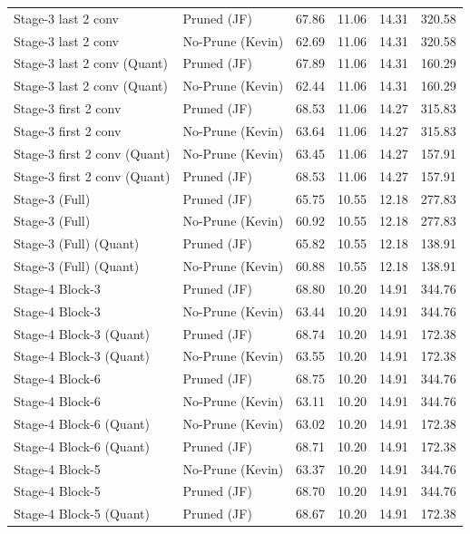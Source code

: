 \begin{table}
\begin{tabular}{llrrrr}
Stage-3 last 2 conv & Pruned (JF) & 67.86 & 11.06 & 14.31 & 320.58 \\
Stage-3 last 2 conv & No-Prune (Kevin) & 62.69 & 11.06 & 14.31 & 320.58 \\
Stage-3 last 2 conv
(Quant) & Pruned (JF) & 67.89 & 11.06 & 14.31 & 160.29 \\
Stage-3 last 2 conv
(Quant) & No-Prune (Kevin) & 62.44 & 11.06 & 14.31 & 160.29 \\
Stage-3 first 2 conv & Pruned (JF) & 68.53 & 11.06 & 14.27 & 315.83 \\
Stage-3 first 2 conv & No-Prune (Kevin) & 63.64 & 11.06 & 14.27 & 315.83 \\
Stage-3 first 2 conv
(Quant) & No-Prune (Kevin) & 63.45 & 11.06 & 14.27 & 157.91 \\
Stage-3 first 2 conv
(Quant) & Pruned (JF) & 68.53 & 11.06 & 14.27 & 157.91 \\
Stage-3 (Full) & Pruned (JF) & 65.75 & 10.55 & 12.18 & 277.83 \\
Stage-3 (Full) & No-Prune (Kevin) & 60.92 & 10.55 & 12.18 & 277.83 \\
Stage-3 (Full)
(Quant) & Pruned (JF) & 65.82 & 10.55 & 12.18 & 138.91 \\
Stage-3 (Full)
(Quant) & No-Prune (Kevin) & 60.88 & 10.55 & 12.18 & 138.91 \\
Stage-4 Block-3 & Pruned (JF) & 68.80 & 10.20 & 14.91 & 344.76 \\
Stage-4 Block-3 & No-Prune (Kevin) & 63.44 & 10.20 & 14.91 & 344.76 \\
Stage-4 Block-3
(Quant) & Pruned (JF) & 68.74 & 10.20 & 14.91 & 172.38 \\
Stage-4 Block-3
(Quant) & No-Prune (Kevin) & 63.55 & 10.20 & 14.91 & 172.38 \\
Stage-4 Block-6 & Pruned (JF) & 68.75 & 10.20 & 14.91 & 344.76 \\
Stage-4 Block-6 & No-Prune (Kevin) & 63.11 & 10.20 & 14.91 & 344.76 \\
Stage-4 Block-6
(Quant) & No-Prune (Kevin) & 63.02 & 10.20 & 14.91 & 172.38 \\
Stage-4 Block-6
(Quant) & Pruned (JF) & 68.71 & 10.20 & 14.91 & 172.38 \\
Stage-4 Block-5 & No-Prune (Kevin) & 63.37 & 10.20 & 14.91 & 344.76 \\
Stage-4 Block-5 & Pruned (JF) & 68.70 & 10.20 & 14.91 & 344.76 \\
Stage-4 Block-5
(Quant) & Pruned (JF) & 68.67 & 10.20 & 14.91 & 172.38 \\

\end{tabular}
\end{table}
